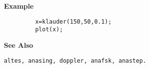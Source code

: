 {\bf \large \sf Example}
\begin{verbatim}
         x=klauder(150,50,0.1); 
         plot(x);
\end{verbatim}
\vspace*{.5cm}


{\bf \large \sf See Also}\\
\hspace*{1.5cm}
\begin{minipage}[t]{13.5cm}
\begin{verbatim}
altes, anasing, doppler, anafsk, anastep.
\end{verbatim}
\end{minipage}


